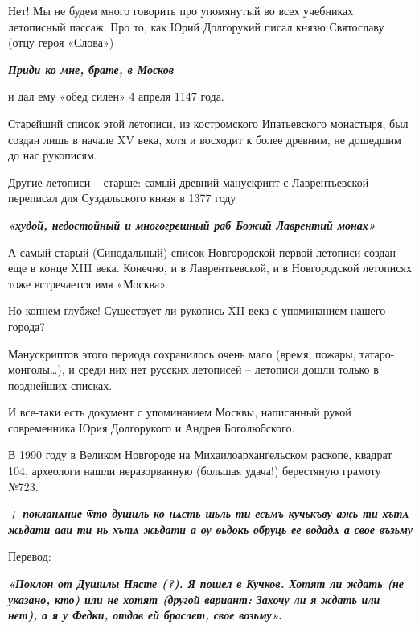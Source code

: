 \begin{multicols}{2}

Нет! Мы не будем много говорить про упомянутый во всех учебниках летописный
пассаж. Про то, как Юрий Долгорукий писал князю Святославу (отцу героя «Слова»)

\begin{leftbar}
  \begingroup
    \em\bfseries\color{blue}\Large Приди ко мне, брате, в Москов
  \endgroup
\end{leftbar}

и дал ему «обед силен» 4 апреля 1147 года.

Старейший список этой летописи, из костромского Ипатьевского монастыря, был
создан лишь в начале XV века, хотя и восходит к более древним, не дошедшим до
нас рукописям.

Другие летописи – старше: самый древний манускрипт с Лаврентьевской переписал
для Суздальского князя в 1377 году

\begin{leftbar}
  \begingroup
    \em\Large\bfseries\color{blue}
«худой, недостойный и многогрешный раб Божий Лаврентий монах» 
  \endgroup
\end{leftbar}



А самый старый (Синодальный) список Новгородской первой летописи создан еще в
конце XIII века. Конечно, и в Лаврентьевской, и в Новгородской летописях тоже
встречается имя «Москва».

Но копнем глубже! Существует ли рукопись XII века с упоминанием нашего города?

Манускриптов этого периода сохранилось очень мало (время, пожары,
татаро-монголы…), и среди них нет русских летописей – летописи дошли только в
позднейших списках.

И все-таки есть документ с упоминанием Москвы, написанный рукой современника
Юрия Долгорукого и Андрея Боголюбского.

В 1990 году в Великом Новгороде на Михаилоархангельском раскопе, квадрат 104,
археологи нашли неразорванную (большая удача!) берестяную грамоту №723.

\begin{leftbar}
\begingroup
\em\Large\bfseries\color{blue}
+ покланѧние ѿто душиль ко нѧсть шьль ти есьмъ кучькъву ажь ти
хътѧ жьдати ааи ти нь хътѧ жьдати а оу ѳьдокь обруць ее водадѧ а свое възьму
\endgroup
\end{leftbar}

Перевод:

\begin{leftbar}
  \begingroup
    \em\Large\bfseries\color{blue}
    «Поклон от Душилы Нясте (?). Я пошел в Кучков. Хотят ли ждать (не указано,
    кто) или не хотят (другой вариант: Захочу ли я ждать или нет), а я у Федки,
    отдав ей браслет, свое возьму».
  \endgroup
\end{leftbar}
    
\end{multicols}


